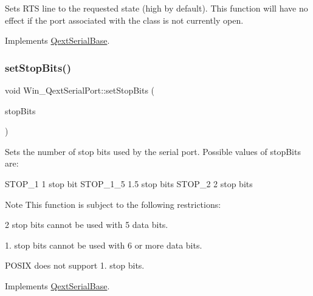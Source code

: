 Sets R\+TS line to the requested state (high by default). This function will have no effect if the port associated with the class is not currently open. 

Implements \mbox{\hyperlink{class_qext_serial_base}{Qext\+Serial\+Base}}.

\mbox{\label{class_win___qext_serial_port_a67fc083cb06b6b1872fc4360cd599821}} 
\subsubsection{\texorpdfstring{set\+Stop\+Bits()}{setStopBits()}}
{\footnotesize\ttfamily void Win\+\_\+\+Qext\+Serial\+Port\+::set\+Stop\+Bits (\begin{DoxyParamCaption}\item[{Stop\+Bits\+Type}]{stop\+Bits }\end{DoxyParamCaption})\hspace{0.3cm}{\ttfamily [virtual]}}

Sets the number of stop bits used by the serial port. Possible values of stop\+Bits are\+: \begin{DoxyVerb}    STOP_1      1 stop bit
    STOP_1_5    1.5 stop bits
    STOP_2      2 stop bits
\end{DoxyVerb}


\begin{DoxyNote}{Note}
This function is subject to the following restrictions\+: 
\end{DoxyNote}
\begin{DoxyParagraph}{}
2 stop bits cannot be used with 5 data bits. 
\end{DoxyParagraph}
\begin{DoxyParagraph}{}
1. stop bits cannot be used with 6 or more data bits. 
\end{DoxyParagraph}
\begin{DoxyParagraph}{}
P\+O\+S\+IX does not support 1. stop bits. 
\end{DoxyParagraph}


Implements \mbox{\hyperlink{class_qext_serial_base}{Qext\+Serial\+Base}}.

\mbox{\label{class_win___qext_serial_port_a0044d8db328690aa72ba6c1c07cb66a3}} 
